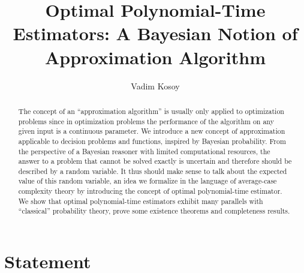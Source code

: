 \documentclass{article}
\numberwithin{equation}{section}
\theoremstyle{definition}
\theoremstyle{plain}
\begin{document}
\title{Optimal Polynomial-Time Estimators: A Bayesian Notion of Approximation Algorithm}

\author{Vadim Kosoy}

\maketitle

\begin{abstract}
The concept of an \enquote{approximation algorithm} is usually only applied to optimization problems since in optimization problems the performance of the algorithm on any given input is a continuous parameter. We introduce a new concept of approximation applicable to decision problems and functions, inspired by Bayesian probability. From the perspective of a Bayesian reasoner with limited computational resources, the answer to a problem that cannot be solved exactly is uncertain and therefore should be described by a random variable. It thus should make sense to talk about the expected value of this random variable, an idea we formalize in the language of average-case complexity theory by introducing the concept of optimal polynomial-time estimator. We show that optimal polynomial-time estimators exhibit many parallels with \enquote{classical} probability theory, prove some existence theorems and completeness results.%
\end{abstract}

\section*{Statement}
\end{document}
